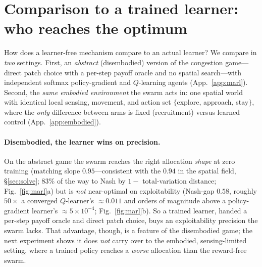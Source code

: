 \documentclass{article}
\begin{document}
\section{Comparison to a trained learner: who reaches the optimum}
\label{sec:compare}
How does a learner-free mechanism compare to an actual learner? We compare in \emph{two} settings. First, an
\emph{abstract} (disembodied) version of the congestion game---direct patch choice with a per-step payoff
oracle and no spatial search---with independent softmax policy-gradient and $Q$-learning agents
(App.~\ref{app:marl}). Second, the \emph{same embodied environment} the swarm acts in: one spatial world with
identical local sensing, movement, and action set $\{$explore, approach, stay$\}$, where the \emph{only}
difference between arms is fixed (recruitment) versus learned control (App.~\ref{app:embodied}).

\paragraph{Disembodied, the learner wins on precision.} On the abstract game the swarm reaches the right
allocation \emph{shape} at zero training (matching slope $0.95$---consistent with the $0.94$ in the spatial
field, \S\ref{sec:solve}; $83\%$ of the way to Nash by $1-$ total-variation distance; Fig.~\ref{fig:marl}a) but
is \emph{not} near-optimal on exploitability (Nash-gap $0.58$, roughly $50\times$ a converged $Q$-learner's
$\approx0.011$ and orders of magnitude above a policy-gradient learner's $\approx5\times10^{-4}$;
Fig.~\ref{fig:marl}b). So a trained learner, handed a per-step payoff oracle and direct patch choice, buys an
exploitability precision the swarm lacks. That advantage, though, is a feature of the disembodied game; the next
experiment shows it does \emph{not} carry over to the embodied, sensing-limited setting, where a trained policy
reaches a \emph{worse} allocation than the reward-free swarm.
\end{document}
